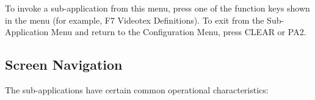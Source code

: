 \documentclass[letterpaper,10pt,english]{sphinxmanual}
\begin{document}

To invoke a sub-application from this menu, press one of the function keys shown in the menu (for example, F7 \textendash{} Videotex Definitions). To exit from the Sub-Application Menu and return to the Configuration Menu, press CLEAR or PA2.

\ignorespaces 

\subsection{Screen Navigation}
\label{\detokenize{connectivity_guide:screen-navigation}}\label{\detokenize{connectivity_guide:index-3}}
The sub-applications have certain common operational characteristics:
\end{document}
